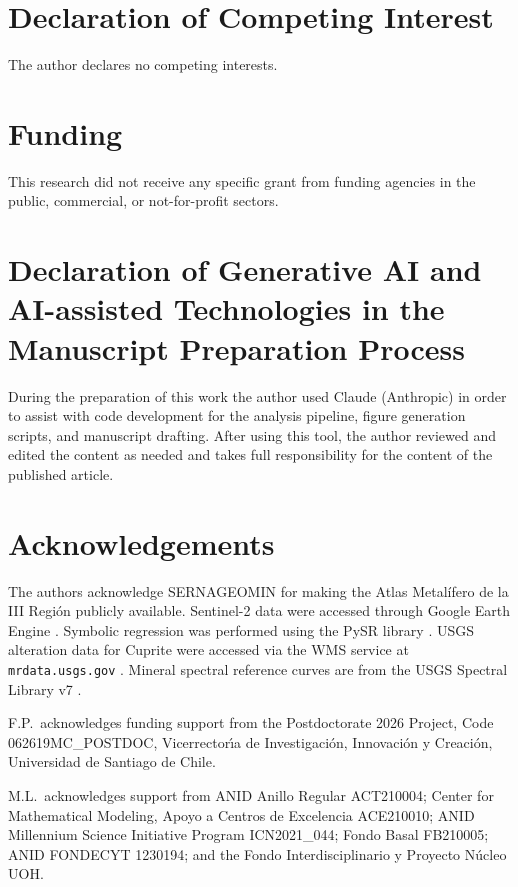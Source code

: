 \documentclass[preprint,authoryear,number]{elsarticle}
\begin{document}
\section*{Declaration of Competing Interest}

The author declares no competing interests.

\section*{Funding}

This research did not receive any specific grant from funding agencies in the public, commercial, or not-for-profit sectors.

\section*{Declaration of Generative AI and AI-assisted Technologies in the Manuscript Preparation Process}

During the preparation of this work the author used Claude (Anthropic) in order to assist with code development for the analysis pipeline, figure generation scripts, and manuscript drafting. After using this tool, the author reviewed and edited the content as needed and takes full responsibility for the content of the published article.

\section*{Acknowledgements}

The authors acknowledge SERNAGEOMIN for making the Atlas Metal\'ifero de la III Regi\'on publicly available. Sentinel-2 data were accessed through Google Earth Engine \citep{Gorelick2017}. Symbolic regression was performed using the PySR library \citep{Cranmer2023}. USGS alteration data for Cuprite were accessed via the WMS service at \texttt{mrdata.usgs.gov} \citep{Rockwell2017}. Mineral spectral reference curves are from the USGS Spectral Library v7 \citep{Kokaly2017}.

F.P.\ acknowledges funding support from the Postdoctorate 2026 Project, Code 062619MC\_POSTDOC, Vicerrector\'\i a de Investigaci\'on, Innovaci\'on y Creaci\'on, Universidad de Santiago de Chile.

M.L.\ acknowledges support from ANID Anillo Regular ACT210004; Center for Mathematical Modeling, Apoyo a Centros de Excelencia ACE210010; ANID Millennium Science Initiative Program ICN2021\_044; Fondo Basal FB210005; ANID FONDECYT 1230194; and the Fondo Interdisciplinario y Proyecto N\'ucleo UOH.




\end{document}
